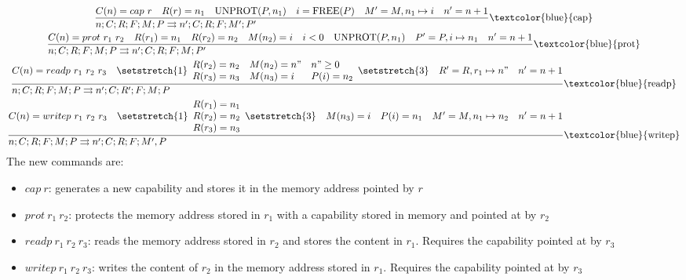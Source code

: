 \documentclass{article}
\newcommand{\execs}[0]{\ensuremath{\rightrightarrows}}
\begin{document}
\begin{gather*}
    \st[\textcolor{blue}{cap}]{n;C;R;F;M;P \execs n';C;R;F;M';P'}{
        C(n)=cap\ r \quad
        R(r)=n_1 \quad
        \te{UNPROT}(P,n_1) \quad
        i = \te{FREE}(P) \quad
        M' = M,n_1\mapsto i \quad
        n'=n+1
    } \\
    \st[\textcolor{blue}{prot}]{n;C;R;F;M;P \execs n';C;R;F;M;P'}{
        C(n)=prot\ r_1\ r_2 \quad 
        R(r_1) = n_1 \quad
        R(r_2) = n_2 \quad
        M(n_2) = i \quad
        i<0 \quad
        \te{UNPROT}(P, n_1) \quad
        P' = P,i\mapsto n_1 \quad
        n'=n+1
    } \\
    \st[\textcolor{blue}{readp}]{n;C;R;F;M;P \execs n';C;R';F;M;P}{
        C(n)=readp\ r_1\ r_2\ r_3 \quad
        \setstretch{1}\begin{array}{lll}R(r_2)=n_2 & M(n_2)=n" & n"\geq 0\\R(r_3)=n_3 & M(n_3)=i & P(i)=n_2\\\end{array}\setstretch{3} \quad
        R'=R,r_1\mapsto n" \quad
        n'=n+1
    } \\
    \st[\textcolor{blue}{writep}]{n;C;R;F;M;P \execs n';C;R;F;M',P}{
        C(n)=writep\ r_1\ r_2\ r_3 \quad
        \setstretch{1}\begin{array}{lll}R(r_1)=n_1 \\ R(r_2)=n_2 \\ R(r_3)=n_3 \end{array}\setstretch{3} \quad
        M(n_3)=i \quad
        P(i)=n_1 \quad
        M' = M,n_1\mapsto n_2 \quad
        n'=n+1
    }
\end{gather*}
The new commands are:
\begin{itemize}
    \item $cap\ r$: generates a new capability and stores it in the memory address pointed by $r$
    \item $prot\ r_1\ r_2$: protects the memory address stored in $r_1$ with a capability stored in memory and pointed at by $r_2$
    \item $readp\ r_1\ r_2\ r_3$: reads the memory address stored in $r_2$ and stores the content in $r_1$. Requires the capability pointed at by $r_3$
    \item $writep\ r_1\ r_2\ r_3$: writes the content of $r_2$ in the memory address stored in $r_1$. Requires the capability pointed at by $r_3$
\end{itemize}

\newpage
\end{document}
